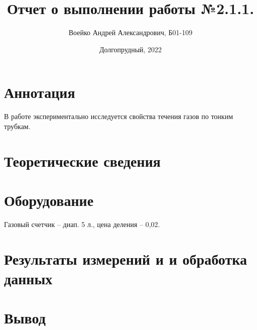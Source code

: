 \documentclass[a4paper,11pt]{article}
\title{Отчет о выполнении работы №2.1.1.}
\author{Воейко Андрей Александрович, Б01-109}
\date{Долгопрудный, 2022}
\begin{document}
\maketitle
\newpage
\section{Аннотация}
В работе экспериментально исследуется свойства течения газов по тонким трубкам.
\section{Теоретические сведения}
\section{Оборудование}
Газовый счетчик -- диап. 5 л., цена деления -- 0,02.

\section{Результаты измерений и и обработка данных}
\section{Вывод}
\end{document}
